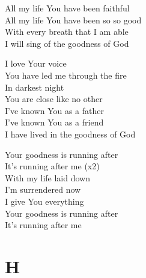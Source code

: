 \documentclass{beamer}
\begin{document}
{\begin{frame}{}
All my life You have been faithful\\ 
All my life You have been so so good\\ 
With every breath that I am able\\ 
I will sing of the goodness of God 

\end{frame}

\hypertarget{Goodness of God['All my life You have been faithful']2}{}
\begin{frame}{}
\fontsize{ 20 }{ 27 }\selectfont

I love Your voice\\ 
You have led me through the fire\\ 
In darkest night\\ 
You are close like no other\\ 
I've known You as a father\\ 
I've known You as a friend\\ 
I have lived in the goodness of God 

\end{frame}

\hypertarget{Goodness of God['All my life You have been faithful']Br}{}
\begin{frame}{}
\fontsize{ 20 }{ 27 }\selectfont

Your goodness is running after\\ 
It’s running after me (x2)\\ 
With my life laid down\\ 
I’m surrendered now\\ 
I give You everything\\ 
Your goodness is running after\\ 
It's running after me 

\end{frame}

}
\section{H}
\end{document}
